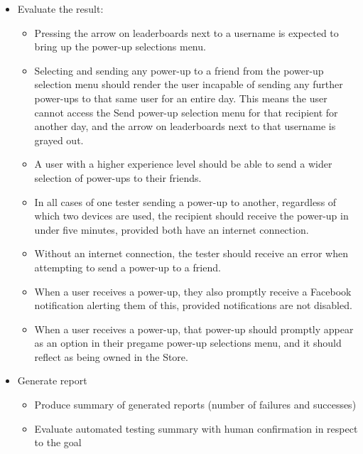 \begin{itemize}
\item Evaluate the result: 
\begin{itemize}
\item Pressing the arrow on leaderboards next to a username is expected to bring up the power-up selections menu.
\item Selecting and sending any power-up to a friend from the power-up selection menu should render the user incapable of sending
any further power-ups to that same user for an entire day. This means the user cannot access the Send power-up selection menu for 
that recipient for another day, and the arrow on leaderboards next to that username is grayed out.
\item A user with a higher experience level should be able to send a wider selection of power-ups to their friends.
\item In all cases of one tester sending a power-up to another, regardless of which two devices are used, the recipient should
receive the power-up in under five minutes, provided both have an internet connection.
\item Without an internet connection, the tester should receive an error when attempting to send a power-up to a friend.
\item When a user receives a power-up, they also promptly receive a Facebook notification alerting them of this, provided notifications are not disabled.
\item When a user receives a power-up, that power-up should promptly appear as an option in their pregame power-up selections menu, and it should
reflect as being owned in the Store.
\end{itemize}

\item Generate report 
\begin{itemize}
\item Produce summary of generated reports (number of failures and successes)
\item Evaluate automated testing summary with human confirmation in respect to the goal
\end{itemize}
\end{itemize}

